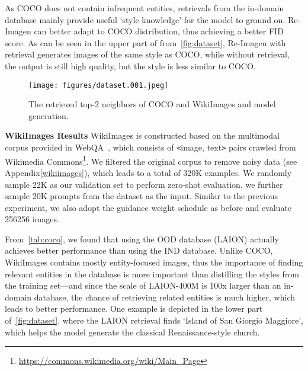 \documentclass{article} \usepackage{iclr2023_conference,times}
\newcommand{\modelname}{{Re-Imagen}\xspace}
\begin{document}
As COCO does not contain infrequent entities, retrievals from the in-domain database mainly provide useful `style knowledge' for the model to ground on. \modelname can better adapt to COCO distribution, thus achieving a better FID score. As can be seen in the upper part of from~\autoref{fig:dataset}, \modelname with retrieval generates images of the same style as COCO, while without retrieval, the output is still high quality, but the style is less similar to COCO.
\begin{figure}[!t]
    \centering
    \texttt{[image: figures/dataset.001.jpeg]}
    \caption{{The retrieved top-2 neighbors of COCO and WikiImages and model generation.}}
    \label{fig:dataset}
    \vspace{-2ex}
\end{figure}

\noindent\textbf{WikiImages Results}
WikiImages is constructed based on the multimodal corpus provided in Web\-QA~\citep{chang2022webqa}, which consists of \texttt{<}image, text\texttt{>} pairs crawled from Wikimedia Commons\footnote{\url{https://commons.wikimedia.org/wiki/Main_Page}}. We filtered the original corpus to remove noisy data (see Appendix\ref{wikiimages}), which leads to a total of 320K examples. We randomly sample 22K as our validation set to perform zero-shot evaluation, we further sample 20K prompts from the dataset as the input. Similar to the previous experiment, we also adopt the guidance weight schedule as before and evaluate 256256 images.

From~\autoref{tab:coco}, we found that using the OOD database (LAION) actually achieves better performance than using the IND database. Unlike COCO, WikiImages contains mostly entity-focused images, thus the importance of finding relevant entities in the database is more important than distilling the styles from the training set---and since the scale of LAION-400M is 100x larger than an in-domain database, the chance of retrieving related entities is much higher, which leads to better performance. One example is depicted in the lower part of~\autoref{fig:dataset}, where the LAION retrieval finds `Island of San Giorgio Maggiore', which helps the model generate the classical Renaissance-style church. 
\end{document}
